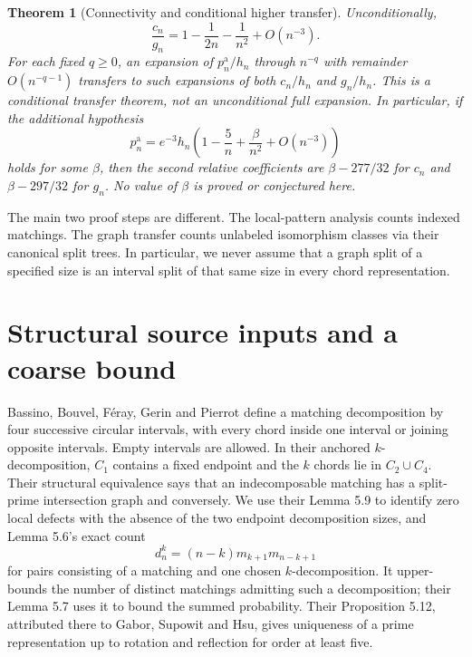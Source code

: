 \documentclass[11pt,letterpaper]{article}
\numberwithin{equation}{section}
\newtheorem{theorem}{Theorem}[section]
\theoremstyle{definition}\newtheorem{definition}[theorem]{Definition}
\theoremstyle{remark}\newtheorem{remark}[theorem]{Remark}
\begin{document}
\begin{theorem}[Connectivity and conditional higher transfer]
\label{cgr:fc:thm:transfer-summary}
Unconditionally,
\begin{equation}\label{cgr:fc:eq:ratio-main}
 \frac{c_n}{g_n}=1-\frac1{2n}-\frac1{n^2}+O(n^{-3}).
\end{equation}
For each fixed $q\ge0$, an expansion of $p_n^{\mathrm a}/h_n$
through $n^{-q}$ with remainder $O(n^{-q-1})$ transfers to such
expansions of both $c_n/h_n$ and $g_n/h_n$. This is a conditional
transfer theorem, not an unconditional full expansion. In
particular, if the additional hypothesis
\[
 p_n^{\mathrm a}=e^{-3}h_n\left(1-\frac5n+
                  \frac\beta{n^2}+O(n^{-3})\right)
\]
holds for some $\beta$, then the second relative coefficients are
$\beta-277/32$ for $c_n$ and $\beta-297/32$ for $g_n$.
No value of $\beta$ is proved or conjectured here.
\end{theorem}

The main two proof steps are different. The local-pattern analysis
counts indexed matchings. The graph transfer counts unlabeled
isomorphism classes via their canonical split trees. In particular,
we never assume that a graph split of a specified size is an
interval split of that same size in every chord representation.

\section{Structural source inputs and a coarse bound}\label{cgr:fc:sec:inputs}
Bassino, Bouvel, F\'eray, Gerin and Pierrot
\cite[Definition 5.3, Proposition 5.5]{BBFGP24} define a matching
decomposition by four successive circular intervals, with every
chord inside one interval or joining opposite intervals. Empty
intervals are allowed. In their anchored $k$-decomposition,
$C_1$ contains a fixed endpoint and the $k$ chords lie in
$C_2\cup C_4$. Their structural equivalence says that an
indecomposable matching has a split-prime intersection graph and
conversely. We use their Lemma 5.9 to identify zero local defects
with the absence of the two endpoint decomposition sizes, and
Lemma 5.6's exact count
\begin{equation}\label{cgr:fc:eq:source-decomp}
 d_n^k=(n-k)m_{k+1}m_{n-k+1}
\end{equation}
for pairs consisting of a matching and one chosen $k$-decomposition.
It upper-bounds the number of distinct matchings admitting such a
decomposition; their Lemma 5.7 uses it to bound the summed
probability. Their Proposition 5.12, attributed there to
Gabor, Supowit and Hsu, gives uniqueness of a prime representation
up to rotation and reflection for order at least five.
\end{document}
